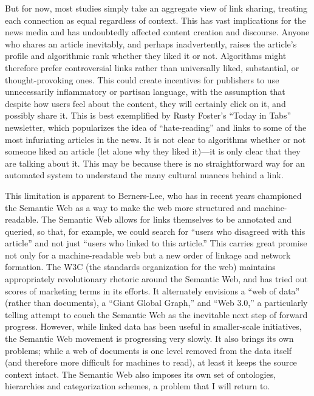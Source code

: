 But for now, most studies simply take an aggregate view of link sharing, treating each connection as equal regardless of context. This has vast implications for the news media and has undoubtedly affected content creation and discourse. Anyone who shares an article inevitably, and perhaps inadvertently, raises the article's profile and algorithmic rank whether they liked it or not. Algorithms might therefore prefer controversial links rather than universally liked, substantial, or thought-provoking ones. This could create incentives for publishers to use unnecessarily inflammatory or partisan language, with the assumption that despite how users feel about the content, they will certainly click on it, and possibly share it. This is best exemplified by Rusty Foster's ``Today in Tabs'' newsletter, which popularizes the idea of ``hate-reading'' and links to some of the most infuriating articles in the news. It is not clear to algorithms whether or not someone liked an article (let alone why they liked it)—it is only clear that they are talking about it. This may be because there is no straightforward way for an automated system to understand the many cultural nuances behind a link.

This limitation is apparent to Berners-Lee, who has in recent years championed the Semantic Web as a way to make the web more structured and machine-readable. The Semantic Web allows for links themselves to be annotated and queried, so that, for example, we could search for ``users who disagreed with this article'' and not just ``users who linked to this article.'' This carries great promise not only for a machine-readable web but a new order of linkage and network formation. The W3C (the standards organization for the web) maintains appropriately revolutionary rhetoric around the Semantic Web, and has tried out scores of marketing terms in its efforts. It alternately envisions a ``web of data'' (rather than documents), a ``Giant Global Graph,'' and ``Web 3.0,'' a particularly telling attempt to couch the Semantic Web as the inevitable next step of forward progress. However, while linked data has been useful in smaller-scale initiatives, the Semantic Web movement is progressing very slowly. It also brings its own problems; while a web of documents is one level removed from the data itself (and therefore more difficult for machines to read), at least it keeps the source context intact. The Semantic Web also imposes its own set of ontologies, hierarchies and categorization schemes, a problem that I will return to.

